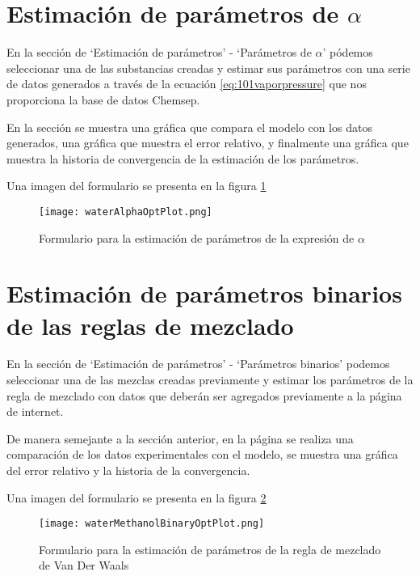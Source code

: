 	
\section{Estimación de parámetros de $\alpha$}\label{sec:webAlphaOptim}
	En la sección de `Estimación de parámetros' - `Parámetros de $\alpha$' pódemos seleccionar una de las substancias creadas y estimar sus parámetros con una serie de datos generados a través de la ecuación \ref{eq:101vaporpressure} que nos proporciona la base de datos Chemsep.

	En la sección se muestra una gráfica que compara el modelo con los datos generados, una gráfica que muestra el error relativo, y finalmente una gráfica que muestra la historia de convergencia de la estimación de los parámetros.

	Una imagen del formulario se presenta en la figura \ref{fig:alphaOptim}

\begin{figure}[H]
	\texttt{[image: waterAlphaOptPlot.png]}
	\caption{Formulario para la estimación de parámetros de la expresión de $\alpha$}
	\label{fig:alphaOptim}
\end{figure}


\section{Estimación de parámetros binarios de las reglas de mezclado}\label{sec:webBinaryOptim}
	En la sección de `Estimación de parámetros' - `Parámetros binarios' podemos seleccionar una de las mezclas creadas previamente y estimar los parámetros de la regla de mezclado con datos que deberán ser agregados previamente a la página de internet.

	De manera semejante a la sección anterior, en la página se realiza una comparación de los datos experimentales con el modelo, se muestra una gráfica del error relativo y la historia de la convergencia.

	Una imagen del formulario se presenta en la figura \ref{fig:binaryOptim}
\begin{figure}[H]
	\texttt{[image: waterMethanolBinaryOptPlot.png]}
	\caption{Formulario para la estimación de parámetros de la regla de mezclado de Van Der Waals}
	\label{fig:binaryOptim}
\end{figure}
